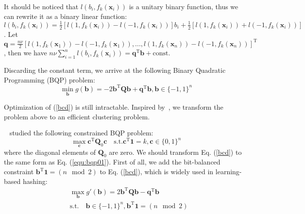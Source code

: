 \documentclass[conference]{IEEEtran}
\begin{document}
It should be noticed that $l (b_{i}, f_k(\mathbf{x}_i))$ is a unitary binary function, thus we can rewrite it as a binary linear function: $l (b_{i}, f_k(\mathbf{x}_i))=\frac{1}{2}[l (1,f_k(\mathbf{x}_i))-l (-1,f_k(\mathbf{x}_i))] b_i + \frac{1}{2}[l (1,f_k(\mathbf{x}_i))+l (-1,f_k(\mathbf{x}_i))]$. Let $\mathbf{q}=\frac{n \nu}{2}[l (1,f_k(\mathbf{x}_1))-l (-1,f_k(\mathbf{x}_1)),...,l (1,f_k(\mathbf{x}_n))-l (-1,f_k(\mathbf{x}_n))]^\mathrm{T}$, then we have $n \nu \sum_{i=1}^n l (b_{i}, f_k(\mathbf{x}_i))=\mathbf{q}^\mathrm{T} \mathbf{b} + \mathrm{const}$. 

Discarding the constant term, we arrive at the following Binary Quadratic Programming (BQP) problem:
\begin{equation}
\min_{\mathbf{b}} g(\mathbf{b}) = - 2\mathbf{b}^\mathrm{T} \mathbf{Q} \mathbf{b} + \mathbf{q}^\mathrm{T} \mathbf{b}, \mathbf{b} \in \{-1,1\}^n
\label{bcd}
\end{equation}

Optimization of (\ref{bcd}) is still intractable. Inspired by~\cite{yang2013new,kang2016column}, we transform the problem above to an efficient clustering problem.

~\cite{yang2013new} studied the following constrained BQP problem:
\begin{equation}
    \max_{\mathbf{c}} \mathbf{c}^\mathrm{T}\mathbf{Q}_0\mathbf{c} \quad \mathrm{s.t.} \mathbf{c}^\mathrm{T}\mathbf{1}=k, \mathbf{c} \in \{0,1\}^n
    \label{equ:bqp01}
\end{equation}
where the diagonal elements of $\mathbf{Q}_0$ are zero. We should transform Eq. (\ref{bcd}) to the same form as Eq. (\ref{equ:bqp01}). First of all, we add the bit-balanced constraint $\mathbf{b}^\mathrm{T} \mathbf{1}=(n\mod 2)$ to Eq. (\ref{bcd}), which is widely used in learning-based hashing:
\begin{equation}
\begin{split}
&\max_{\mathbf{b}} g'(\mathbf{b}) = 2\mathbf{b}^\mathrm{T} \mathbf{Q} \mathbf{b} - \mathbf{q}^\mathrm{T} \mathbf{b} \\
&\mathrm{s.t.} \quad \mathbf{b} \in \{-1,1\}^n, \mathbf{b}^\mathrm{T} \mathbf{1}=(n\mod 2)
\end{split}
\label{equ:bqpminus1}
\end{equation}
\end{document}
